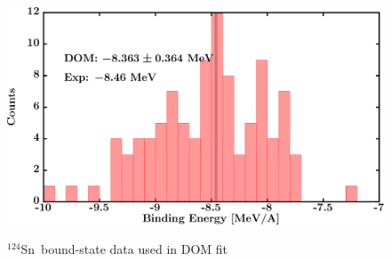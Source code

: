 \documentclass[twocolumn,secnumarabic,amssymb, nobibnotes, aps, prl,
superscriptaddress, nobalancelastpage]{revtex4}
\newcommand{\snFour}{\ensuremath{^{124}}S\lowercase{n}}
\begin{document}
\begin{figure}[!htb]
\begin{minipage}{0.4\linewidth}
        \label{DOM_sn124_RMSRadius}
    \end{minipage}
    \begin{minipage}{0.4\linewidth}
        \centering
        \includegraphics[width=\linewidth]{figures/sn124_BE.png}
        \label{DOM_sn124_BE}
    \end{minipage}
    \caption{\snFour\ bound-state data used in DOM fit}
    \label{DOM_sn124_structural}
\end{figure}
\end{document}
